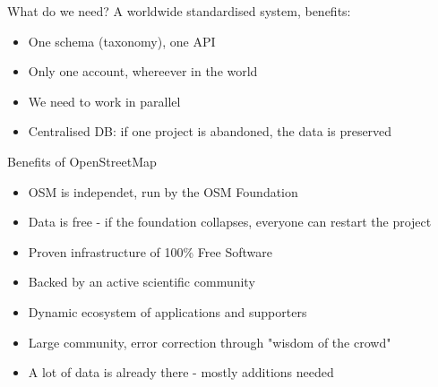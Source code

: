 \documentclass{beamer}
\begin{document}
\begin{frame}{What do we need?}
	A worldwide standardised system, benefits:
\begin{itemize}
  \item One schema (taxonomy), one API
  \item Only one account, whereever in the world
  \item We need to work in parallel
  \item Centralised DB: if one project is abandoned, the data is preserved
\end{itemize}
\end{frame}

\begin{frame}{Benefits of OpenStreetMap}

\begin{itemize}
  \item OSM is independet, run by the OSM Foundation
  \item Data is free - if the foundation collapses, everyone can restart the project
  \item Proven infrastructure of 100\% Free Software
  \item Backed by an active scientific community
  \item Dynamic ecosystem of applications and supporters
  \item Large community, error correction through "wisdom of the crowd"
  \item A lot of data is already there - mostly additions needed
\end{itemize}

\end{frame}


%
%
%
\end{document}

